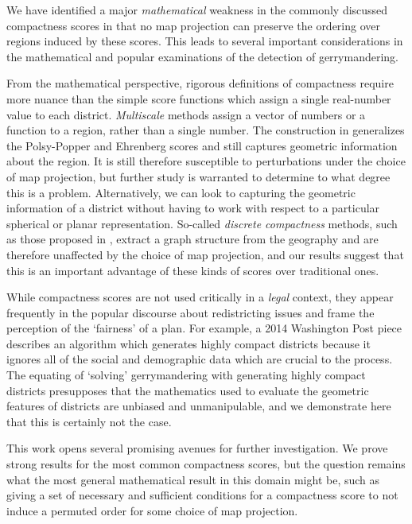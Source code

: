 
We have identified a major \textit{mathematical} weakness in the commonly discussed compactness scores in that no map projection can preserve the ordering over regions induced by these scores.  This leads to several important considerations in the mathematical and popular examinations of the detection of gerrymandering.

From the mathematical perspective, rigorous definitions of compactness require more nuance than the simple score functions which assign a single real-number value to each district.  \textit{Multiscale} methods assign a vector of numbers or a function to a region, rather than a single number.  The construction in \cite{deford2018tv} generalizes the Polsy-Popper and Ehrenberg scores and still captures geometric information about the region. It is still therefore susceptible to perturbations under the choice of map projection, but further study is warranted to determine to what degree this is a problem.
Alternatively, we can look to capturing the geometric information of a district without having to work with respect to a particular spherical or planar representation.  So-called \textit{discrete compactness} methods, such as those proposed in \cite{duchin2018discrete}, extract a graph structure from the geography and are therefore unaffected by the choice of map projection, and our results suggest that this is an important advantage of these kinds of scores over traditional ones.


While compactness scores are not used critically in a \textit{legal} context, they appear frequently in the popular discourse about redistricting issues and frame the perception of the `fairness' of a plan.  For example, a 2014 Washington Post piece  \cite{ingraham2014solve} describes an algorithm which generates highly compact districts because it ignores all of the social and demographic data which are crucial to the process.  The equating of `solving' gerrymandering with generating highly compact districts presupposes that the mathematics used to evaluate the geometric features of districts are unbiased and unmanipulable, and we demonstrate here that this is certainly not the case.


This work opens several promising avenues for further investigation.  We prove strong results for the most common compactness scores, but the question remains what the most general mathematical result in this domain might be, such as giving a set of necessary and sufficient conditions for a compactness score to not induce a permuted order for some choice of map projection.  